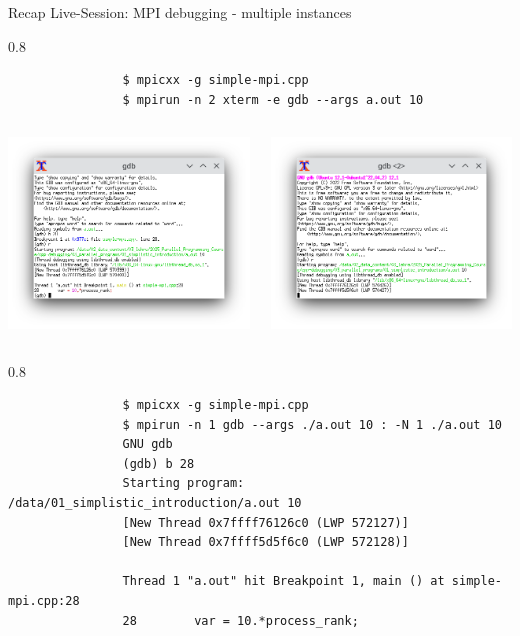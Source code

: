 \documentclass[aspectratio=1610]{beamer}
\newenvironment{centeredblock}[2][0.8\textwidth]
{ %
	\begin{center}
		\begin{varwidth}{#1} %
			\begin{block}{#2}
				\centering
			}
			{ %
			\end{block}
		\end{varwidth}
	\end{center}
}
\begin{document}
	\begin{frame}[fragile]{Recap Live-Session: MPI debugging - multiple instances}
		\begin{centeredblock}{}
			\begin{verbatim}
				$ mpicxx -g simple-mpi.cpp
				$ mpirun -n 2 xterm -e gdb --args a.out 10
			\end{verbatim}
			\vspace{-0.5cm}
			\begin{columns}
				\begin{column}{0.5 \textwidth}
					\centering
					\includegraphics[width=0.7\linewidth]{figures/gdb-xterm-window-0}
				\end{column}
				\begin{column}{0.5 \textwidth}
					\centering					
					\includegraphics[width=0.7\linewidth]{figures/gdb-xterm-window-1}
				\end{column}
			\end{columns}
			\vspace{-0.5cm}
		\end{centeredblock}
		
		\begin{centeredblock}{}
			\begin{verbatim}
				$ mpicxx -g simple-mpi.cpp
				$ mpirun -n 1 gdb --args ./a.out 10 : -N 1 ./a.out 10
				GNU gdb
				(gdb) b 28
				Starting program: /data/01_simplistic_introduction/a.out 10
				[New Thread 0x7ffff76126c0 (LWP 572127)]
				[New Thread 0x7ffff5d5f6c0 (LWP 572128)]
				
				Thread 1 "a.out" hit Breakpoint 1, main () at simple-mpi.cpp:28
				28        var = 10.*process_rank;
			\end{verbatim}
		\end{centeredblock}
	\end{frame}
\end{document}
